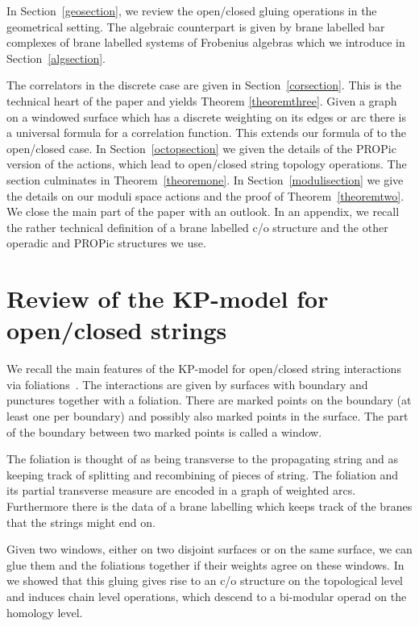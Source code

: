 \documentclass[pdftex]{sigma}
\begin{document}
In Section~\ref{geosection}, we review the open/closed gluing operations in the
geometrical setting. The algebraic counterpart is given by brane labelled bar
complexes of brane labelled systems of Frobenius algebras which we
introduce in Section~\ref{algsection}.

The correlators in the discrete case are given in Section~\ref{corsection}. This is the technical heart of the paper and
yields Theorem \ref{theoremthree}. Given a graph  on a windowed surface which has a discrete weighting on its edges or arc there is a  universal formula for a correlation function. This extends our formula of \cite{hoch2} to the open/closed case.
In Section~\ref{octopsection} we given the details of the PROPic version of the actions,
which lead to open/closed
string topology operations. The section culminates in Theorem~\ref{theoremone}.
 In Section~\ref{modulisection} we give the details on our moduli space actions and the proof of Theorem~\ref{theoremtwo}.
We close the main part of the paper with an outlook. In an appendix,
we recall the rather technical def\/inition of a brane labelled c/o
structure and the other operadic and PROPic structures we use.


\section{Review of the KP-model for open/closed strings}
\label{reviewsection}

We recall the main features of the KP-model for open/closed string
interactions via foliations~\cite{KP}.  The interactions are given by surfaces
with boundary and punctures together with a foliation. There are marked points
on the boundary (at least one per boundary) and possibly also marked points
in the surface. The part of the boundary between two marked points is called a window.

The foliation is thought of as being transverse to the propagating string and as keeping
track of splitting and recombining of pieces of string. The foliation and its partial transverse measure
are encoded in a graph of weighted arcs. Furthermore there is the data of a brane
labelling which keeps track of the branes that the strings might end on.


Given two windows, either on two disjoint surfaces or on the same
surface, we can glue them and the foliations together if their
weights agree on these windows. In \cite{KP} we showed that this
gluing gives rise to an c/o structure on the topological level and
induces  chain level operations, which descend to a bi-modular
operad on the homology level.
\end{document}

